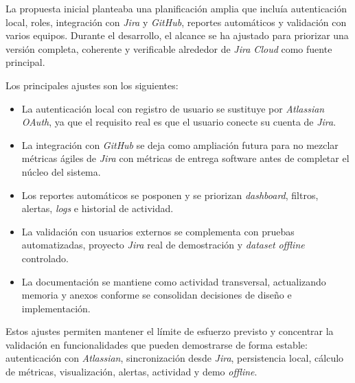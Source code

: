 La propuesta inicial planteaba una planificación amplia que incluía autenticación local, roles, integración con \textit{Jira} y \textit{GitHub}, reportes automáticos y validación con varios equipos. Durante el desarrollo, el alcance se ha ajustado para priorizar una versión completa, coherente y verificable alrededor de \textit{Jira Cloud} como fuente principal.

Los principales ajustes son los siguientes:

\begin{itemize}
    \item La autenticación local con registro de usuario se sustituye por \textit{Atlassian OAuth}, ya que el requisito real es que el usuario conecte su cuenta de \textit{Jira}.
    \item La integración con \textit{GitHub} se deja como ampliación futura para no mezclar métricas ágiles de \textit{Jira} con métricas de entrega software antes de completar el núcleo del sistema.
    \item Los reportes automáticos se posponen y se priorizan \textit{dashboard}, filtros, alertas, \textit{logs} e historial de actividad.
    \item La validación con usuarios externos se complementa con pruebas automatizadas, proyecto \textit{Jira} real de demostración y \textit{dataset} \textit{offline} controlado.
    \item La documentación se mantiene como actividad transversal, actualizando memoria y anexos conforme se consolidan decisiones de diseño e implementación.
\end{itemize}

Estos ajustes permiten mantener el límite de esfuerzo previsto y concentrar la validación en funcionalidades que pueden demostrarse de forma estable: autenticación con \textit{Atlassian}, sincronización desde \textit{Jira}, persistencia local, cálculo de métricas, visualización, alertas, actividad y demo \textit{offline}.
